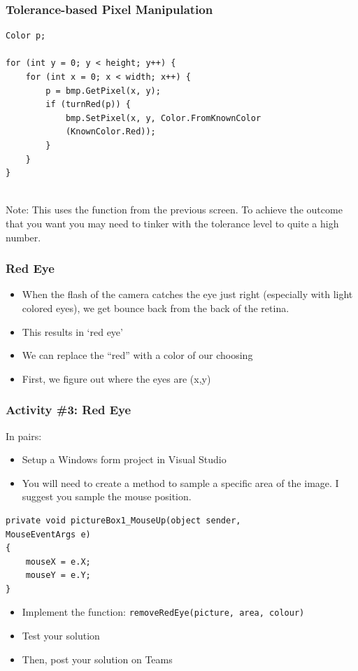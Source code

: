 \begin{frame}[fragile]
	\frametitle{Tolerance-based Pixel Manipulation}
	
	\begin{lstlisting}
Color p;

for (int y = 0; y < height; y++) {
	for (int x = 0; x < width; x++) {
		p = bmp.GetPixel(x, y);
		if (turnRed(p))	{
			bmp.SetPixel(x, y, Color.FromKnownColor
			(KnownColor.Red));
		}
	}
}
		
	\end{lstlisting}
Note: This uses the function from the previous screen. To achieve the outcome that you want you may need to tinker with the tolerance level to quite a high number.	
	
\end{frame}
		

\begin{frame}
	\frametitle{Red Eye}
	
	\begin{itemize}		
		\item When the flash of the camera catches the eye just right (especially with light colored eyes), we get bounce back from the back of the retina.
		\item This results in `red eye'
		\item We can replace the “red” with a color of our choosing
		\item First, we figure out where the eyes are (x,y)
	\end{itemize}
\end{frame}


\begin{frame}[fragile]
	\frametitle{Activity \#3: Red Eye}
	
	In pairs:
	
	\vspace{1em}
	
	\begin{itemize}		
		\item Setup a Windows form project in Visual Studio
		\item You will need to create a method to sample a specific area of the image. I suggest you sample the mouse position.
		\end{itemize}
	\begin{lstlisting}
private void pictureBox1_MouseUp(object sender,
MouseEventArgs e)
{
	mouseX = e.X;
	mouseY = e.Y;
}
\end{lstlisting}
	\begin{itemize}	
		\item Implement the function: \texttt{removeRedEye(picture, area, colour)}
		\item Test your solution
		\item Then, post your solution on Teams
	\end{itemize}


\end{frame}

